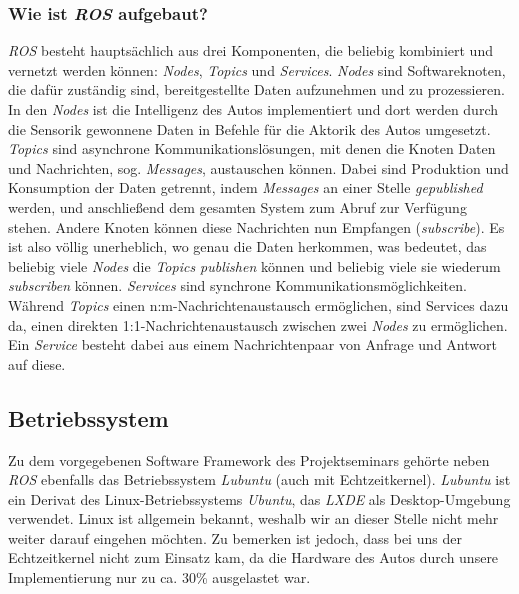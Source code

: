 \subsubsection{Wie ist \textit{ROS} aufgebaut?}
\textit{ROS} besteht hauptsächlich aus drei Komponenten, die beliebig kombiniert und vernetzt werden können: \textit{Nodes}, \textit{Topics} und \textit{Services}. \textit{Nodes} sind Softwareknoten, die dafür zuständig sind, bereitgestellte Daten aufzunehmen und zu prozessieren. In den \textit{Nodes} ist die Intelligenz des Autos implementiert und dort werden durch die Sensorik gewonnene Daten in Befehle für die Aktorik des Autos umgesetzt. 
\textit{Topics} sind asynchrone Kommunikationslösungen, mit denen die Knoten Daten und Nachrichten, sog. \textit{Messages}, austauschen können. Dabei sind Produktion und Konsumption der Daten getrennt, indem \textit{Messages} an einer Stelle \textit{gepublished} werden, und anschließend dem gesamten System zum Abruf zur Verfügung stehen. Andere Knoten können diese Nachrichten nun Empfangen (\textit{subscribe}). Es ist also völlig unerheblich, wo genau die Daten herkommen, was bedeutet, das beliebig viele \textit{Nodes} die \textit{Topics publishen} können und beliebig viele sie wiederum \textit{subscriben} können. 
\textit{Services} sind synchrone Kommunikationsmöglichkeiten. Während \textit{Topics} einen n:m-Nachrichtenaustausch ermöglichen, sind Services dazu da, einen direkten 1:1-Nachrichtenaustausch zwischen zwei \textit{Nodes} zu ermöglichen. Ein \textit{Service} besteht dabei aus einem Nachrichtenpaar von Anfrage und Antwort auf diese. 

\subsection{Betriebssystem}
Zu dem vorgegebenen Software Framework des Projektseminars gehörte neben \textit{ROS} ebenfalls das Betriebssystem \textit{Lubuntu} (auch mit Echtzeitkernel). \textit{Lubuntu} ist ein Derivat des Linux-Betriebssystems \textit{Ubuntu}, das \textit{LXDE} als Desktop-Umgebung verwendet. Linux ist allgemein bekannt, weshalb wir an dieser Stelle nicht mehr weiter darauf eingehen möchten. 
Zu bemerken ist jedoch, dass bei uns der Echtzeitkernel nicht zum Einsatz kam, da die Hardware des Autos durch unsere Implementierung nur zu ca. 30\% ausgelastet war. 

